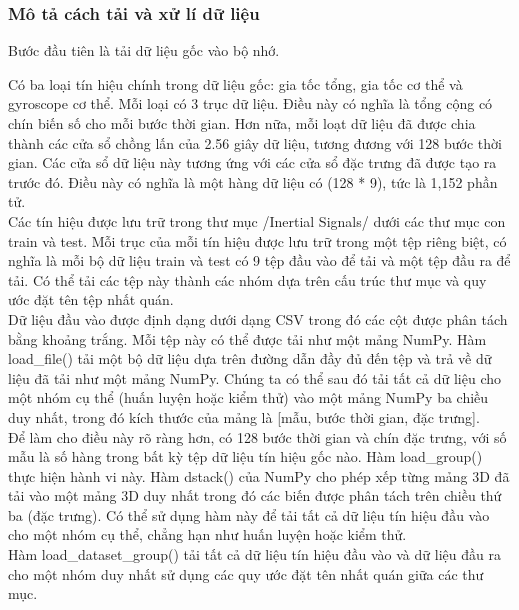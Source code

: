 \subsubsection{Mô tả cách tải và xử lí dữ liệu}

Bước đầu tiên là tải dữ liệu gốc vào bộ nhớ.


Có ba loại tín hiệu chính trong dữ liệu gốc: gia tốc tổng, gia tốc cơ thể và gyroscope cơ thể. Mỗi loại có 3 trục dữ liệu. Điều này có nghĩa là tổng cộng có chín biến số cho mỗi bước thời gian. Hơn nữa, mỗi loạt dữ liệu đã được chia thành các cửa sổ chồng lấn của 2.56 giây dữ liệu, tương đương với 128 bước thời gian. Các cửa sổ dữ liệu này tương ứng với các cửa sổ đặc trưng đã được tạo ra trước đó. Điều này có nghĩa là một hàng dữ liệu có (128 * 9), tức là 1,152 phần tử.\\


Các tín hiệu được lưu trữ trong thư mục /Inertial Signals/ dưới các thư mục con train và test. Mỗi trục của mỗi tín hiệu được lưu trữ trong một tệp riêng biệt, có nghĩa là mỗi bộ dữ liệu train và test có 9 tệp đầu vào để tải và một tệp đầu ra để tải. Có thể tải các tệp này thành các nhóm dựa trên cấu trúc thư mục và quy ước đặt tên tệp nhất quán.\\


Dữ liệu đầu vào được định dạng dưới dạng CSV trong đó các cột được phân tách bằng khoảng trắng. Mỗi tệp này có thể được tải như một mảng NumPy. Hàm load\_file() tải một bộ dữ liệu dựa trên đường dẫn đầy đủ đến tệp và trả về dữ liệu đã tải như một mảng NumPy. Chúng ta có thể sau đó tải tất cả dữ liệu cho một nhóm cụ thể (huấn luyện hoặc kiểm thử) vào một mảng NumPy ba chiều duy nhất, trong đó kích thước của mảng là [mẫu, bước thời gian, đặc trưng].\\


Để làm cho điều này rõ ràng hơn, có 128 bước thời gian và chín đặc trưng, với số mẫu là số hàng trong bất kỳ tệp dữ liệu tín hiệu gốc nào. Hàm load\_group() thực hiện hành vi này. Hàm dstack() của NumPy cho phép  xếp từng mảng 3D đã tải vào một mảng 3D duy nhất trong đó các biến được phân tách trên chiều thứ ba (đặc trưng).
Có thể sử dụng hàm này để tải tất cả dữ liệu tín hiệu đầu vào cho một nhóm cụ thể, chẳng hạn như huấn luyện hoặc kiểm thử. \\


Hàm load\_dataset\_group() tải tất cả dữ liệu tín hiệu đầu vào và dữ liệu đầu ra cho một nhóm duy nhất sử dụng các quy ước đặt tên nhất quán giữa các thư mục.\\


